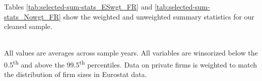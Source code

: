 \documentclass[12pt,notitlepage]{article}
\begin{document}
Tables \ref{tab:selected-sum-stats_ESwgt_FR} and \ref{tab:selected-sum-stats_Nowgt_FR} show the weighted and unweighted summary statistics for our cleaned sample. 


\begin{table}[!htpb]
\caption{Weighted French Summary Statistics}
\label{tab:selected-sum-stats_ESwgt_FR}
\tabularnewline \\
All values are averages across sample years. All variables are winsorized below the 0.5\textsuperscript{th} and above the 99.5\textsuperscript{th} percentiles. Data on private firms is weighted to match the distribution of firm sizes in Eurostat data.
\end{table}
\end{document}
